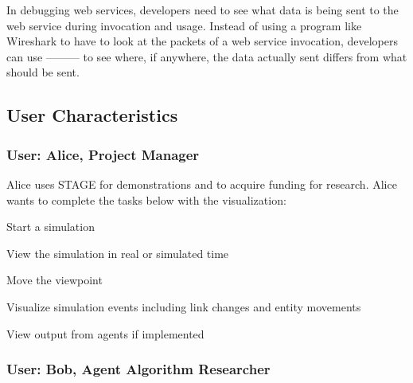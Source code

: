 \documentclass[titlepage]{article}
\begin{document}
In debugging web services, developers need to see what data is being sent to
the web service during invocation and usage.  Instead of using a program like
Wireshark to have to look at the packets of a web service invocation,
developers can use --------- to see where, if anywhere, the data actually
sent differs from what should be sent.


\subsection{User Characteristics%
  \label{user-characteristics}%
}



\subsubsection{User: Alice, Project Manager%
  \label{alice}%
}

Alice uses STAGE for demonstrations and to acquire funding for research.  Alice wants to complete the tasks below with
the visualization:

\begin{itemize*}
    \item Start a simulation
    \item View the simulation in real or simulated time
    \item Move the viewpoint
    \item Visualize simulation events including link changes and entity movements
    \item View output from agents if implemented
\end{itemize*}

\subsubsection{User: Bob, Agent Algorithm Researcher%
  \label{bob}%
}
\end{document}
